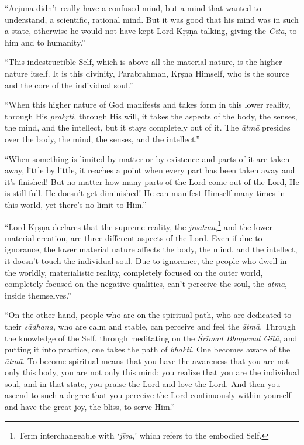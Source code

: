 \enquote{Arjuna didn’t really have a confused mind, but a mind that wanted to understand, a scientific, rational mind. But it was good that his mind was in such a state, otherwise he would not have kept Lord Kṛṣṇa talking, giving the \textit{Gītā}, to him and to humanity.}

\enquote{This indestructible Self, which is above all the material nature, is the higher nature itself. It is this divinity, Parabrahman, Kṛṣṇa Himself, who is the source and the core of the individual soul.}

\enquote{When this higher nature of God manifests and takes form in this lower reality, through His \textit{prakṛti}, through His will, it takes the aspects of the body, the senses, the mind, and the intellect, but it stays completely out of it. The \textit{ātmā} presides over the body, the mind, the senses, and the intellect.}

\enquote{When something is limited by matter or by existence and parts of it are taken away, little by little, it reaches a point when every part has been taken away and it’s finished! But no matter how many parts of the Lord come out of the Lord, He is still full. He doesn’t get diminished! He can manifest Himself many times in this world, yet there’s no limit to Him.}

\enquote{Lord Kṛṣṇa declares that the supreme reality, the \textit{jīvātmā},\footnote{Term interchangeable with \enquote{\textit{jīva},} which refers to the embodied Self.} and the lower material creation, are three different aspects of the Lord. Even if due to ignorance, the lower material nature affects the body, the mind, and the intellect, it doesn’t touch the individual soul. Due to ignorance, the people who dwell in the worldly, materialistic reality, completely focused on the outer world, completely focused on the negative qualities, can’t perceive the soul, the \textit{ātmā}, inside themselves.}

\enquote{On the other hand, people who are on the spiritual path, who are dedicated to their \textit{sādhana}, who are calm and stable, can perceive and feel the \textit{ātmā}. Through the knowledge of the Self, through meditating on the \textit{Śrīmad Bhagavad Gītā}, and putting it into practice, one takes the path of \textit{bhakti}. One becomes aware of the \textit{ātmā}. To become spiritual means that you have the awareness that you are not only this body, you are not only this mind: you realize that you are the individual soul, and in that state, you praise the Lord and love the Lord. And then you ascend to such a degree that you perceive the Lord continuously within yourself and have the great joy, the bliss, to serve Him.}

